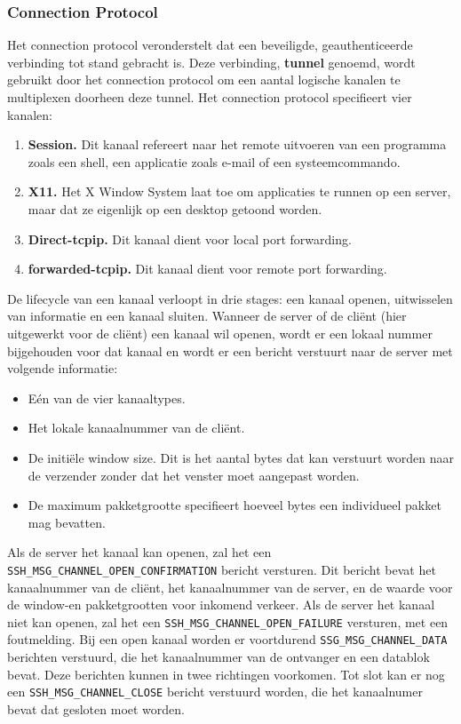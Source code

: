 \documentclass{report}
\begin{document}
	\subsubsection{Connection Protocol}
	Het connection protocol veronderstelt dat een beveiligde, geauthenticeerde verbinding tot stand gebracht is. Deze verbinding, \textbf{tunnel} genoemd, wordt gebruikt door het connection protocol om een aantal logische kanalen te multiplexen doorheen deze tunnel. Het connection protocol specifieert vier kanalen:
	\begin{enumerate}
		\item \textbf{Session.} Dit kanaal refereert naar het remote uitvoeren van een programma zoals een shell, een applicatie zoals e-mail of een systeemcommando. 
		\item \textbf{X11.} Het X Window System laat toe om applicaties te runnen op een server, maar dat ze eigenlijk op een desktop getoond worden.
		\item \textbf{Direct-tcpip.} Dit kanaal dient voor local port forwarding.
		\item \textbf{forwarded-tcpip.} Dit kanaal dient voor remote port forwarding.
	\end{enumerate}
	De lifecycle van een kanaal verloopt in drie stages: een kanaal openen, uitwisselen van informatie en een kanaal sluiten. Wanneer de server of de cliënt (hier uitgewerkt voor de cliënt) een kanaal wil openen, wordt er een lokaal nummer bijgehouden voor dat kanaal en wordt er een bericht verstuurt naar de server met volgende informatie: 
	\begin{itemize}
		\item Eén van de vier kanaaltypes. 
		\item Het lokale kanaalnummer van de cliënt.
		\item De initiële window size. Dit is het aantal bytes dat kan verstuurt worden naar de verzender zonder dat het venster moet aangepast worden.
		\item De maximum pakketgrootte specifieert hoeveel bytes een individueel pakket mag bevatten.
	\end{itemize}
	Als de server het kanaal kan openen, zal het een \texttt{SSH\_MSG\_CHANNEL\_OPEN\_CONFIRMATION} bericht versturen. Dit bericht bevat het kanaalnummer van de cliënt, het kanaalnummer van de server, en de waarde voor de window-en pakketgrootten voor inkomend verkeer. Als de server het kanaal niet kan openen, zal het een \texttt{SSH\_MSG\_CHANNEL\_OPEN\_FAILURE} versturen, met een foutmelding. Bij een open kanaal worden er voortdurend \texttt{SSG\_MSG\_CHANNEL\_DATA} berichten verstuurd, die het kanaalnummer van de ontvanger en een datablok bevat. Deze berichten kunnen in twee richtingen voorkomen. Tot slot kan er nog een \texttt{SSH\_MSG\_CHANNEL\_CLOSE} bericht verstuurd worden, die het kanaalnumer bevat dat gesloten moet worden.
	
\end{document}
